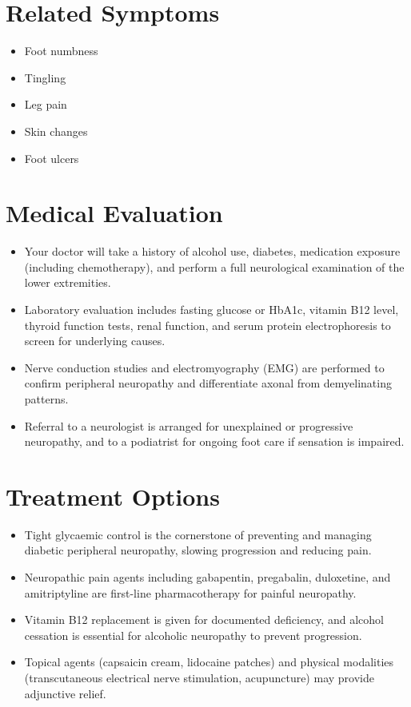 \section*{Related Symptoms}
\begin{itemize}
 \item Foot numbness
 \item Tingling
 \item Leg pain
 \item Skin changes
 \item Foot ulcers
\end{itemize}


\section*{Medical Evaluation}
\begin{itemize}
 \item Your doctor will take a history of alcohol use, diabetes, medication exposure (including chemotherapy), and perform a full neurological examination of the lower extremities.
 \item Laboratory evaluation includes fasting glucose or HbA1c, vitamin B12 level, thyroid function tests, renal function, and serum protein electrophoresis to screen for underlying causes.
 \item Nerve conduction studies and electromyography (EMG) are performed to confirm peripheral neuropathy and differentiate axonal from demyelinating patterns.
 \item Referral to a neurologist is arranged for unexplained or progressive neuropathy, and to a podiatrist for ongoing foot care if sensation is impaired.
\end{itemize}

\section*{Treatment Options}
\begin{itemize}
 \item Tight glycaemic control is the cornerstone of preventing and managing diabetic peripheral neuropathy, slowing progression and reducing pain.
 \item Neuropathic pain agents including gabapentin, pregabalin, duloxetine, and amitriptyline are first-line pharmacotherapy for painful neuropathy.
 \item Vitamin B12 replacement is given for documented deficiency, and alcohol cessation is essential for alcoholic neuropathy to prevent progression.
 \item Topical agents (capsaicin cream, lidocaine patches) and physical modalities (transcutaneous electrical nerve stimulation, acupuncture) may provide adjunctive relief.
\end{itemize}

